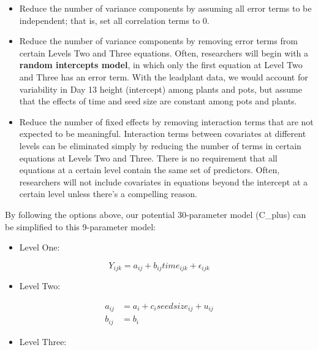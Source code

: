 \documentclass[
]{krantz}
\providecommand{\tightlist}{%
  \setlength{\itemsep}{0pt}\setlength{\parskip}{0pt}}
\begin{document}
\begin{itemize}
\tightlist
\item
  Reduce the number of variance components by assuming all error terms to be independent; that is, set all correlation terms to 0.
\item
  Reduce the number of variance components by removing error terms from certain Levels Two and Three equations. Often, researchers will begin with a \textbf{random intercepts model}, in which only the first equation at Level Two and Three has an error term. With the leadplant data, we would account for variability in Day 13 height (intercept) among plants and pots, but assume that the effects of time and seed size are constant among pots and plants.
\item
  Reduce the number of fixed effects by removing interaction terms that are not expected to be meaningful. Interaction terms between covariates at different levels can be eliminated simply by reducing the number of terms in certain equations at Levels Two and Three. There is no requirement that all equations at a certain level contain the same set of predictors. Often, researchers will not include covariates in equations beyond the intercept at a certain level unless there's a compelling reason.
\end{itemize}

By following the options above, our potential 30-parameter model (C\_plus) can be simplified to this 9-parameter model:

\begin{itemize}
\tightlist
\item
  Level One:
\end{itemize}

\begin{equation}
Y_{ijk} = a_{ij}+b_{ij}\textstyle{time}_{ijk}+\epsilon_{ijk}
\end{equation}

\begin{itemize}
\tightlist
\item
  Level Two:
\end{itemize}

\begin{align*}
a_{ij} & = a_{i}+c_{i}\textstyle{seedsize}_{ij}+u_{ij} \\
b_{ij} & = b_{i}
\end{align*}

\begin{itemize}
\tightlist
\item
  Level Three:
\end{itemize}
\end{document}
